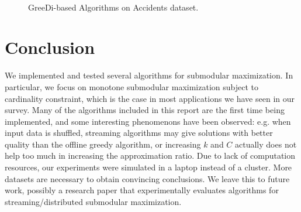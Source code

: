 \documentclass[11pt]{article}
\begin{document}
\begin{figure*}[h!]
     \centering
     ~~
     \caption{{\sc GreeDi}-based Algorithms on {\sc Accidents} dataset.}
     \label{fig:distributed-accidents}
\end{figure*}






\section{Conclusion}
\label{sec:conclude}
We implemented and tested several algorithms for submodular maximization. In particular, we focus on monotone submodular maximization subject to cardinality constraint, which is the case in most applications we have seen in our survey. Many of the algorithms included in this report are the first time being implemented, and some interesting phenomenons have been observed: e.g. when input data is shuffled, streaming algorithms may give solutions with better quality than the offline greedy algorithm, or increasing $k$ and $C$ actually does not help too much in increasing the approximation ratio.  Due to lack of computation resources, our experiments were simulated in a laptop instead of a cluster. More datasets are necessary to obtain  convincing conclusions. We leave this to future work, possibly a research paper that experimentally evaluates algorithms for streaming/distributed submodular maximization.



















%
\end{document}
